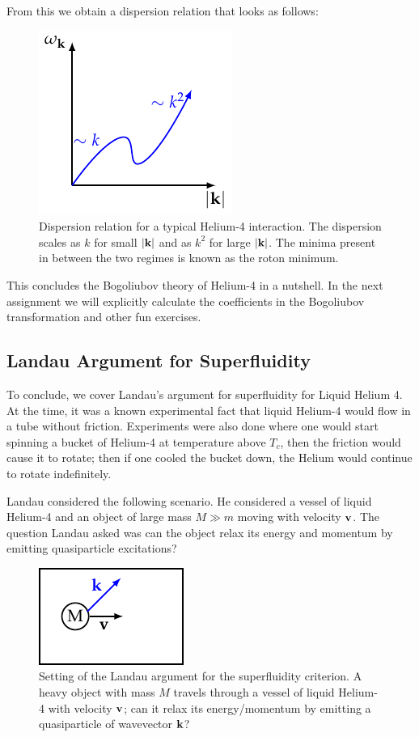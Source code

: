 From this we obtain a dispersion relation that looks as follows:
\begin{figure}[htbp]
    \centering
    \includegraphics[]{Images/fig-Hedispersion.pdf}

    \caption{Dispersion relation for a typical Helium-4 interaction. The dispersion scales as $k$ for small $\lvert \mathbf{k} \rvert$ and as $k^2$ for large $\lvert \mathbf{k} \rvert$. The minima present in between the two regimes is known as the roton minimum.}
    \label{fig-Hedispersion}
\end{figure}

This concludes the Bogoliubov theory of Helium-4 in a nutshell. In the next assignment we will explicitly calculate the coefficients in the Bogoliubov transformation and other fun exercises.

\subsection{Landau Argument for Superfluidity}
To conclude, we cover Landau's argument for superfluidity for Liquid Helium 4. At the time, it was a known experimental fact that liquid Helium-4 would flow in a tube without friction. Experiments were also done where one would start spinning a bucket of Helium-4 at temperature above $T_c$, then the friction would cause it to rotate; then if one cooled the bucket down, the Helium would continue to rotate indefinitely.

Landau considered the following scenario. He considered a vessel of liquid Helium-4 and an object of large mass $M \gg m$ moving with velocity $\mathbf{v}$. The question Landau asked was can the object relax its energy and momentum by emitting quasiparticle excitations? 

\begin{figure}[htbp]
    \centering
    \includegraphics[]{Images/fig-Landaucartoon.pdf}
    \caption{Setting of the Landau argument for the superfluidity criterion. A heavy object with mass $M$ travels through a vessel of liquid Helium-4 with velocity $\mathbf{v}$; can it relax its energy/momentum by emitting a quasiparticle of wavevector $\mathbf{k}$?}
    \label{fig-Landaucartoon}
\end{figure}

